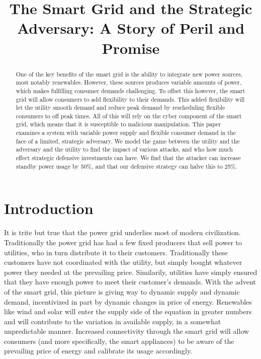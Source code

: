 \documentclass[conference]{IEEEtran}
\begin{document}
\title{The Smart Grid and the Strategic Adversary: A Story of Peril and Promise}

\author{
}

\maketitle

\begin{abstract}
One of the key benefits of the smart grid is the ability to integrate new power sources, most notably renewables.  However, these sources produces variable amounts of power, which makes fulfilling consumer demands challenging.  To offset this however, the smart grid will allow consumers to add flexibility to their demands.  This added flexibility will let the utility smooth demand and reduce peak demand by rescheduling flexible consumers to off peak times.  All of this will rely on the cyber component of the smart grid, which means that it is susceptible to malicious manipulation.  This paper examines a system with variable power supply and flexible consumer demand in the face of a limited, strategic adversary.  We model the game between the utility and the adversary and the utility to find the impact of various attacks, and who how much effect strategic defensive investments can have.  We find that the attacker can increase standby power usage by 50\%, and that our defensive strategy can halve this to 25\%.

\end{abstract}

\section{Introduction}
\label{Introduction}

It is trite but true that the power grid underlies most of modern civilization.  Traditionally the power grid has had a 
few fixed producers that sell power to utilities, who in turn distribute it to their customers.  Traditionally these 
customers have not coordinated with the utility, but simply bought whatever power they needed at the prevailing price.  
Similarily, utilities have simply ensured that they have enough power to meet their customer's demands.  
With the advent of the smart grid, this picture is giving way to dynamic supply and dynamic demand, incentivized in part by dynamic changes in price of energy.  Renewables like wind and solar will enter the supply side of the equation in greater numbers and will contribute to the variation in available supply, in a somewhat unpredictable manner. Increased connectivity through the smart grid will allow consumers (and more specifically, the smart appliances) to be 
aware of the prevailing price of energy and calibrate its usage accordingly. 
\end{document}
